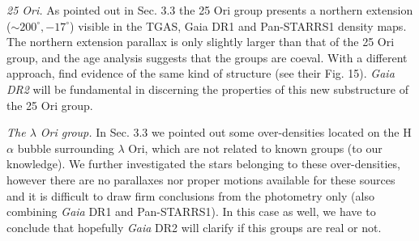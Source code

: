 \documentclass[twocolumn]{aa}
\begin{document}
\textit{25 Ori.} As pointed out in Sec. 3.3 the 25 Ori group presents a northern extension ($\sim 200^{\circ},-17^{\circ}$) visible in the TGAS, Gaia DR1 and Pan-STARRS1 density maps. The northern extension parallax is only slightly larger than that of the 25 Ori group, and the age analysis suggests that the groups are coeval. With a different approach, \cite{Lombardi2017} find evidence of the same kind of structure (see their Fig. 15). \textit{Gaia DR2} will be fundamental in discerning the properties of this new substructure of the 25 Ori group.

\textit{The $\lambda$ Ori group.} In Sec. 3.3 we pointed out some over-densities located on the H$\alpha$ bubble surrounding $\lambda$ Ori, which are not related to known groups (to our knowledge). We further investigated the stars belonging to these over-densities, however there are no parallaxes nor proper motions available for these sources and it is difficult to draw firm conclusions from the photometry only (also combining \textit{Gaia} DR1 and Pan-STARRS1). In this case as well, we have to conclude that hopefully \textit{Gaia} DR2 will clarify if this groups are real or not.
\end{document}
